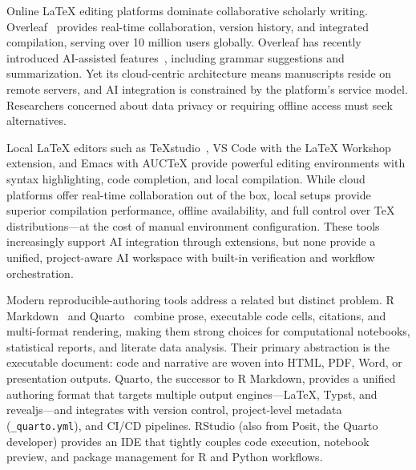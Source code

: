Online \LaTeX{} editing platforms dominate collaborative scholarly writing.
Overleaf~\cite{overleaf} provides real-time collaboration, version history,
and integrated compilation, serving over 10 million users globally.
Overleaf has recently introduced AI-assisted features~\cite{overleaf2024ai},
including grammar suggestions and summarization. Yet its cloud-centric
architecture means manuscripts reside on remote servers, and AI integration is
constrained by the platform's service model. Researchers concerned about data
privacy or requiring offline access must seek alternatives.

Local \LaTeX{} editors such as TeXstudio~\cite{texstudio}, VS Code with the
\LaTeX{} Workshop extension, and Emacs with AUCTeX provide powerful editing
environments with syntax highlighting, code completion, and local compilation.
While cloud platforms offer real-time collaboration out of the box, local
setups provide superior compilation performance, offline availability, and
full control over \TeX{} distributions---at the cost of manual environment
configuration. These tools increasingly support AI integration through
extensions, but none provide a unified, project-aware AI workspace with built-in
verification and workflow orchestration.

Modern reproducible-authoring tools address a related but distinct problem.
R Markdown~\cite{rmarkdown} and Quarto~\cite{quarto} combine prose, executable
code cells, citations, and multi-format rendering, making them strong choices
for computational notebooks, statistical reports, and literate data analysis.
Their primary abstraction is the executable document: code and narrative are
woven into HTML, PDF, Word, or presentation outputs. Quarto, the successor to
R Markdown, provides a unified authoring format that targets multiple output
engines---\LaTeX{}, Typst, and revealjs---and integrates with version control,
project-level metadata (\texttt{\_quarto.yml}), and CI/CD pipelines. RStudio
(also from Posit, the Quarto developer) provides an IDE that tightly couples
code execution, notebook preview, and package management for R and Python
workflows.

